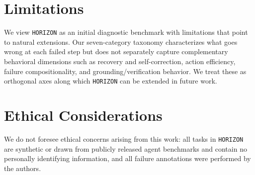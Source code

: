 \documentclass[11pt]{article}
\begin{document}
\clearpage
\section*{Limitations}
We view \texttt{HORIZON} as an initial diagnostic benchmark with limitations that point to natural extensions. Our seven-category taxonomy characterizes what goes wrong at each failed step but does not separately capture complementary behavioral dimensions such as recovery and self-correction, action efficiency, failure compositionality, and grounding/verification behavior. We treat these as orthogonal axes along which \texttt{HORIZON} can be extended in future work.

\section*{Ethical Considerations}

We do not foresee ethical concerns arising from this work: all tasks in \texttt{HORIZON} are synthetic or drawn from publicly released agent benchmarks and contain no personally identifying information, and all failure annotations were performed by the authors.



\end{document}
